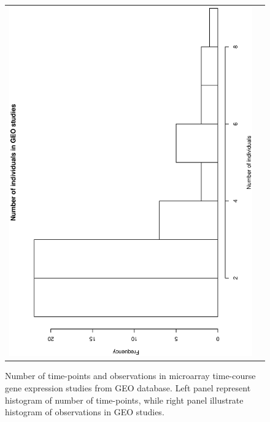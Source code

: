 \documentclass[a4paper]{article}
\begin{document}
\begin{figure}[h!]
\begin{tabular}{cc}
\includegraphics[scale=0.5,angle=270]{GEO2.eps}\\
\end{tabular}
\caption{Number of time-points and observations in microarray time-course gene expression studies from GEO database. Left panel represent histogram of number of time-points, while right panel illustrate histogram of observations in GEO studies.}
\label{fig:GEOhist}
\end{figure}
\end{document}
